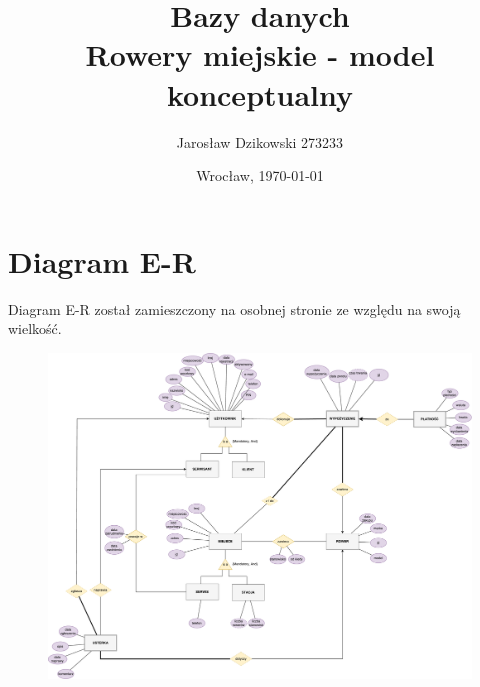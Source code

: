 \documentclass{article}
\author{Jarosław Dzikowski 273233}
\date{Wrocław, \today}
\title{\textbf{Bazy danych} \\ Rowery miejskie - model konceptualny}
\begin{document}
\maketitle

\section{Diagram E-R}
Diagram E-R został zamieszczony na osobnej stronie ze względu na swoją wielkość.
\begin{figure}[p]
\centerline{	\includegraphics[width=\paperwidth, height=\paperheight, keepaspectratio]{diagramfinal.pdf}}
\end{figure}
\end{document}
